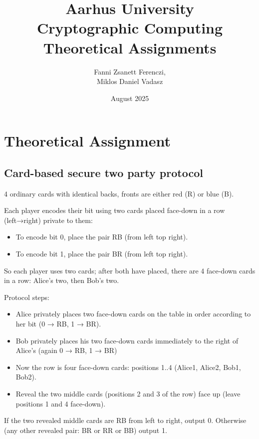 \documentclass{article}
\title{Aarhus University \\ Cryptographic Computing \\ Theoretical Assignments }
\author{ Fanni Zsanett Ferenczi, \\ Miklos Daniel Vadasz}
\date{August 2025}
\begin{document}
\maketitle

%



\section{Theoretical Assignment}

\subsection{Card-based secure two party protocol}

4 ordinary cards with identical backs, fronts are either red (R) or blue (B).

Each player encodes their bit using two cards placed face-down in a row (left→right) private to them:

\begin{itemize}
    \item To encode bit 0, place the pair RB (from left top right).
    \item To encode bit 1, place the pair BR (from left top right).
\end{itemize}
    
So each player uses two cards; after both have placed, there are 4 face-down cards in a row: Alice’s two, then Bob’s two.


Protocol steps:

    \begin{itemize}
        \item Alice privately places two face-down cards on the table in order according to her bit (0 → RB, 1 → BR).
        \item Bob privately places his two face-down cards immediately to the right of Alice’s (again 0 → RB, 1 → BR)
        \item Now the row is four face-down cards: positions 1..4 (Alice1, Alice2, Bob1, Bob2).
        \item Reveal the two middle cards (positions 2 and 3 of the row) face up (leave positions 1 and 4 face-down).
    \end{itemize}
    
If the two revealed middle cards are RB from left to right, output 0. Otherwise (any other revealed pair: BR or RR or BB) output 1. 
\end{document}
